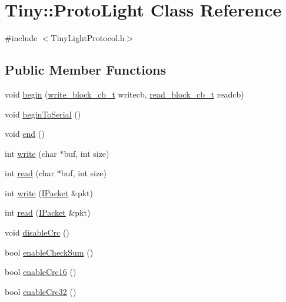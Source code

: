 \hypertarget{classTiny_1_1ProtoLight}{}\section{Tiny\+:\+:Proto\+Light Class Reference}
\label{classTiny_1_1ProtoLight}


{\ttfamily \#include $<$Tiny\+Light\+Protocol.\+h$>$}

\subsection*{Public Member Functions}
\begin{DoxyCompactItemize}
\item 
void \hyperlink{classTiny_1_1ProtoLight_ad27dfcef54a8316228469ef0a4267962}{begin} (\hyperlink{tiny__types_8h_aafd634660bba76cace57a8f9b01e044d}{write\+\_\+block\+\_\+cb\+\_\+t} writecb, \hyperlink{tiny__types_8h_a15bec127d9ee63658563d62e92b5261b}{read\+\_\+block\+\_\+cb\+\_\+t} readcb)
\item 
void \hyperlink{classTiny_1_1ProtoLight_a50bf63fe1891edda48980ca2893485d7}{begin\+To\+Serial} ()
\item 
void \hyperlink{classTiny_1_1ProtoLight_a948b2a0e37177b7434581adc64b36497}{end} ()
\item 
int \hyperlink{classTiny_1_1ProtoLight_a46a27ee9d0b55c88672c98abf04dbdce}{write} (char $\ast$buf, int size)
\item 
int \hyperlink{classTiny_1_1ProtoLight_acf18a8b73ee6c6394270c903ad7882b8}{read} (char $\ast$buf, int size)
\item 
int \hyperlink{classTiny_1_1ProtoLight_ad980940fd5eca35204a70a5cfe5ccccd}{write} (\hyperlink{classTiny_1_1IPacket}{I\+Packet} \&pkt)
\item 
int \hyperlink{classTiny_1_1ProtoLight_aa040cbf16f9c074959fb410db6858b9b}{read} (\hyperlink{classTiny_1_1IPacket}{I\+Packet} \&pkt)
\item 
void \hyperlink{classTiny_1_1ProtoLight_af93e0591ca33137ad79ffb054953001c}{disable\+Crc} ()
\item 
bool \hyperlink{classTiny_1_1ProtoLight_ad7b4ef5a43c187f0d1915efe7450bc40}{enable\+Check\+Sum} ()
\item 
bool \hyperlink{classTiny_1_1ProtoLight_a110b654e476691518790edcc5bf1bd80}{enable\+Crc16} ()
\item 
bool \hyperlink{classTiny_1_1ProtoLight_a8ae8a3ace46234a65f83c564dc56fd26}{enable\+Crc32} ()
\end{DoxyCompactItemize}


